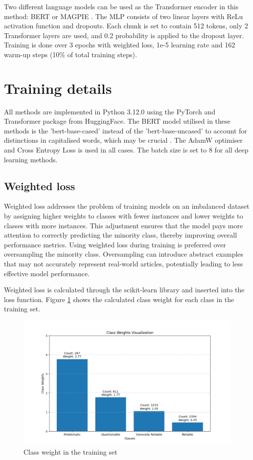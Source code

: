 Two different language models can be used as the Transformer encoder in this method: BERT \cite{devlin-2019-bert} or MAGPIE \cite{horych-2024-magpie}. The MLP consists of two linear layers with ReLu activation function \cite{agarap-2018-relu} and dropouts. Each chunk is set to contain 512 tokens, only 2 Transformer layers are used, and 0.2 probability is applied to the dropout layer. Training is done over 3 epochs with weighted loss, 1e-5 learning rate and 162 warm-up steps (10\% of total training steps).

\section{Training details}

All methods are implemented in Python 3.12.0 \cite{van-1995-python} using the PyTorch \cite{paszke-2017-pytorch} and Transformer \cite{wolf-2020-huggingface} package from HuggingFace. The BERT model utilised in these methods is the 'bert-base-cased' instead of the 'bert-base-uncased' to account for distinctions in capitalised words, which may be crucial \cite{devlin-2019-bert}. The AdamW \cite{loshchilov-2019-adamw} optimiser and Cross Entropy Loss is used in all cases. The batch size is set to 8 for all deep learning methods.

\subsection{Weighted loss}

Weighted loss addresses the problem of training models on an imbalanced dataset by assigning higher weights to classes with fewer instances and lower weights to classes with more instances. This adjustment ensures that the model pays more attention to correctly predicting the minority class, thereby improving overall performance metrics. Using weighted loss during training is preferred over oversampling the minority class. Oversampling can introduce abstract examples that may not accurately represent real-world articles, potentially leading to less effective model performance.

Weighted loss is calculated through the scikit-learn library \cite{pedregosa-2011-scikit-learn} and inserted into the loss function. Figure \ref{fig:class_weight} shows the calculated class weight for each class in the training set.


\begin{figure}[htbp]
    \centering
    \includegraphics[width=0.9\linewidth]{figures/class_weight.png}
    \caption{Class weight in the training set}
    \label{fig:class_weight}
\end{figure}




